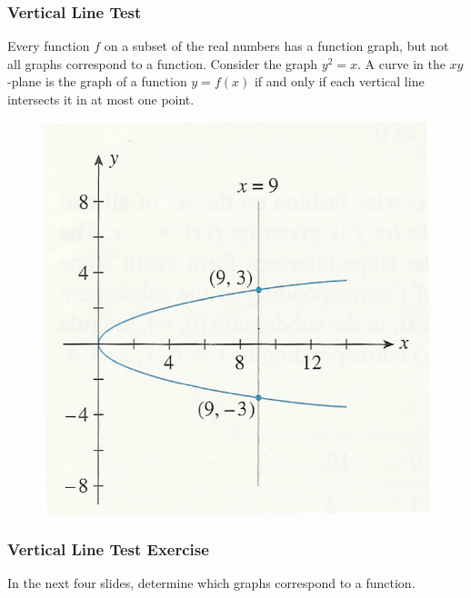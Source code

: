 \documentclass[xcolor=dvipsnames]{beamer}
\begin{document}
\begin{frame}
  \frametitle{Vertical Line Test}
Every function $f$ on a subset of the real numbers has a function
graph, but not all graphs correspond to a function. Consider the graph
$y^{2}=x$. A curve in the $xy$-plane is the graph of a function
$y=f(x)$ if and only if each vertical line intersects it in at most
one point.
  \begin{figure}[h]
    \includegraphics[scale=1]{./fgraph-03.png}
  \end{figure}
\end{frame}

\begin{frame}
  \frametitle{Vertical Line Test Exercise}
In the next four slides, determine which graphs correspond to a function.
\end{frame}
\end{document}
